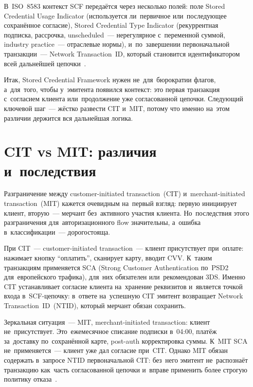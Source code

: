 В~ISO~8583 контекст SCF передаётся через несколько полей: поле
Stored Credential Usage Indicator (используется ли~первичное или~последующее
сохранённое согласие), Stored Credential Type Indicator (рекуррентная
подписка, рассрочка, unscheduled~--- нерегулярное с~переменной суммой,
industry practice~--- отраслевые нормы), и~по~завершении первоначальной
транзакции~--- Network Transaction~ID, который становится идентификатором
всей дальнейшей цепочки~.


Итак, Stored Credential Framework нужен не~для~бюрократии флагов,
а~для~того, чтобы у~эмитента появился контекст: это первая
транзакция с~согласием клиента или~продолжение уже согласованной
цепочки. Следующий ключевой шаг~--- жёстко развести CIT и~MIT,
потому что именно на~этом различии держится вся дальнейшая логика.

\section{CIT vs MIT: различия и~последствия}
\label{sec:subscriptions-cit-mit}

Разграничение между customer-initiated transaction~(CIT) и~merchant-initiated
transaction~(MIT) кажется очевидным на~первый взгляд: первую инициирует
клиент, вторую~--- мерчант без~активного участия клиента. Но~последствия
этого разграничения для~авторизационного flow значительны, а~ошибка
в~классификации~--- дорогостояща.

При CIT~--- customer-initiated transaction~--- клиент присутствует
при~оплате: нажимает кнопку \enquote{оплатить}, сканирует карту, вводит
CVV. К~таким транзакциям применяется SCA (Strong Customer Authentication
по~PSD2 для~европейского трафика), для~них обязателен или~рекомендован 3DS. Именно CIT устанавливает
согласие клиента на~хранение реквизитов и~является точкой входа в~SCF-цепочку:
в~ответе на~успешную CIT эмитент возвращает Network Transaction~ID~(NTID),
который мерчант обязан сохранить.

Зеркальная ситуация~--- MIT, merchant-initiated transaction: клиент
не~присутствует. Это~ежемесячное списание подписки в~04:00, платёж
за~доставку по~сохранённой карте, post-auth корректировка суммы.
К~MIT SCA не~применяется~--- клиент уже дал согласие при~CIT. Однако
MIT обязан содержать в~запросе
NTID первоначальной CIT: без~него эмитент не~распознаёт транзакцию
как~часть согласованной цепочки и~вправе применить более строгую политику
отказа~.


